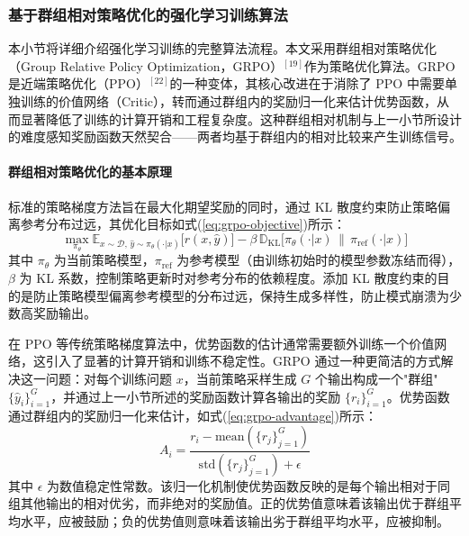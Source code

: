 \subsubsection{基于群组相对策略优化的强化学习训练算法}

本小节将详细介绍强化学习训练的完整算法流程。本文采用群组相对策略优化（Group Relative Policy Optimization，GRPO）$^{[19]}$作为策略优化算法。GRPO 是近端策略优化（PPO）$^{[22]}$的一种变体，其核心改进在于消除了 PPO 中需要单独训练的价值网络（Critic），转而通过群组内的奖励归一化来估计优势函数，从而显著降低了训练的计算开销和工程复杂度。这种群组相对机制与上一小节所设计的难度感知奖励函数天然契合——两者均基于群组内的相对比较来产生训练信号。

\paragraph{群组相对策略优化的基本原理}

标准的策略梯度方法旨在最大化期望奖励的同时，通过 KL 散度约束防止策略偏离参考分布过远，其优化目标如式(\ref{eq:grpo-objective})所示：
\begin{equation}\label{eq:grpo-objective}
  \max_{\pi_\theta} \mathbb{E}_{x \sim \mathcal{D},\, \hat{y} \sim \pi_\theta(\cdot|x)} \big[r(x, \hat{y})\big] - \beta \, \mathbb{D}_{\text{KL}}\!\big[\pi_\theta(\cdot|x) \,\|\, \pi_{\text{ref}}(\cdot|x)\big]
\end{equation}
其中 $\pi_\theta$ 为当前策略模型，$\pi_{\text{ref}}$ 为参考模型（由训练初始时的模型参数冻结而得），$\beta$ 为 KL 系数，控制策略更新时对参考分布的依赖程度。添加 KL 散度约束的目的是防止策略模型偏离参考模型的分布过远，保持生成多样性，防止模式崩溃为少数高奖励输出。

在 PPO 等传统策略梯度算法中，优势函数的估计通常需要额外训练一个价值网络，这引入了显著的计算开销和训练不稳定性。GRPO 通过一种更简洁的方式解决这一问题：对每个训练问题 $x$，当前策略采样生成 $G$ 个输出构成一个"群组" $\{\hat{y}_i\}_{i=1}^G$，并通过上一小节所述的奖励函数计算各输出的奖励 $\{r_i\}_{i=1}^G$。优势函数通过群组内的奖励归一化来估计，如式(\ref{eq:grpo-advantage})所示：
\begin{equation}\label{eq:grpo-advantage}
  A_i = \frac{r_i - \text{mean}(\{r_j\}_{j=1}^G)}{\text{std}(\{r_j\}_{j=1}^G) + \epsilon}
\end{equation}
其中 $\epsilon$ 为数值稳定性常数。该归一化机制使优势函数反映的是每个输出相对于同组其他输出的相对优劣，而非绝对的奖励值。正的优势值意味着该输出优于群组平均水平，应被鼓励；负的优势值则意味着该输出劣于群组平均水平，应被抑制。

